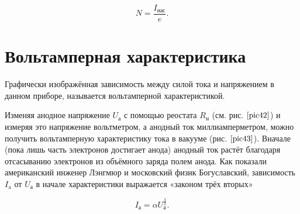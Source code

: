 \documentclass[a4paper,10pt]{book}
\begin{document}
\begin{equation*}
N = \frac{I_\text{нас}}{e}.
\end{equation*}

\section{Вольтамперная характеристика}
Графически изображённая зависимость между силой тока и напряжением в данном приборе, называется вольтамперной характеристикой.

Изменяя анодное напряжение $U_\text{а}$ с помощью реостата $R_\text{н}$ (см. рис. $\ref{pic42}$) и измеряя это напряжение вольтметром, а анодный ток миллиамперметром, можно получить вольтамперную характеристику тока в вакууме (рис. $\ref{pic43}$). Вначале (пока лишь часть электронов достигает анода) анодный ток растёт благодаря отсасыванию электронов из объёмного заряда полем анода. Как показали американский инженер Лэнгмюр и московский физик Богуславский, зависимость $I_\text{a}$ от $U_\text{а}$ в начале характеристики выражается «законом трёх вторых»

\begin{equation}\label{zakon3/2}
I_\text{а} = \alpha U_\text{а}^{\frac{3}{2}}.
\end{equation}

\begin{figure}[h]
	\caption{}
	\label{pic43}
\end{figure}
\end{document}
